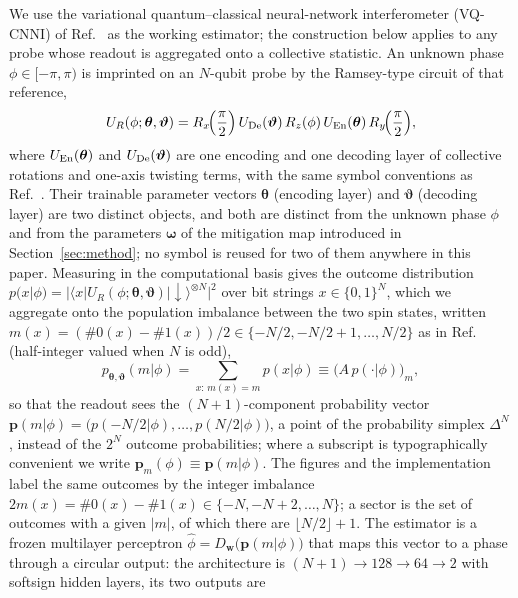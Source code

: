 \documentclass[ASNA,twocolumn]{USG}
\newcommand{\pvec}{\mathbf{p}}
\newcommand{\phihat}{\hat{\phi}}
\begin{document}
We use the variational quantum--classical neural-network interferometer
(VQ-CNNI) of Ref.~\cite{yang2025vqcnni} as the working estimator; the
construction below applies to any probe whose readout is aggregated onto a
collective statistic.  An unknown phase $\phi\in[-\pi,\pi)$ is imprinted on an
$N$-qubit probe by the Ramsey-type circuit of that reference,
\begin{equation}
  U_R(\phi;\bm\theta,\bm\vartheta)
  = R_x\!\Big(\frac{\pi}{2}\Big)\,U_{\rm De}(\bm\vartheta)\,R_z(\phi)\,
    U_{\rm En}(\bm\theta)\,R_y\!\Big(\frac{\pi}{2}\Big),
  \label{eq:probe}
\end{equation}
where $U_{\rm En}(\bm\theta)$ and $U_{\rm De}(\bm\vartheta)$ are one encoding and
one decoding layer of collective rotations and one-axis twisting terms, with the
same symbol conventions as Ref.~\cite{yang2025vqcnni}.  Their trainable parameter
vectors $\bm\theta$ (encoding layer) and $\bm\vartheta$ (decoding layer) are two
distinct objects, and both are distinct from the unknown phase $\phi$ and from
the parameters $\bm\omega$ of the mitigation map introduced in
Section~\ref{sec:method}; no symbol is reused for two of them anywhere in this
paper.  Measuring in the computational basis gives the outcome distribution
$p(x|\phi)=\big|\langle x|U_R(\phi;\bm\theta,\bm\vartheta)
|\downarrow\rangle^{\otimes N}\big|^2$ over bit strings $x\in\{0,1\}^N$, which we
aggregate onto the population imbalance between the two spin states,
written $m(x)=(\#0(x)-\#1(x))/2\in\{-N/2,-N/2+1,\dots,N/2\}$ as in
Ref.~\cite{yang2025vqcnni} (half-integer valued when $N$ is odd),
\begin{equation}
  p_{\bm\theta,\bm\vartheta}(m|\phi)
  = \sum_{x:\,m(x)=m} p(x|\phi)
  \equiv \big(A\,p(\cdot|\phi)\big)_m ,
  \label{eq:aggregate}
\end{equation}
so that the readout sees the $(N+1)$-component probability vector
$\pvec(m|\phi)=\big(p(-N/2|\phi),\dots,p(N/2|\phi)\big)$, a point of the
probability simplex $\Delta^N$, instead of the $2^N$
outcome probabilities; where a subscript is typographically convenient we write
$\pvec_m(\phi)\equiv\pvec(m|\phi)$.  The figures and the implementation label the
same outcomes by the integer imbalance $2m(x)=\#0(x)-\#1(x)\in\{-N,-N+2,\dots,N\}$; a
sector is the set of outcomes with a given $|m|$, of which there are
$\lfloor N/2\rfloor+1$.  The estimator is a frozen multilayer
perceptron $\phihat=D_{\mathbf w}\big(\pvec(m|\phi)\big)$ that maps this vector
to a phase through a circular output: the architecture is
$(N{+}1)\to128\to64\to2$ with softsign hidden layers, its two outputs are
\end{document}
